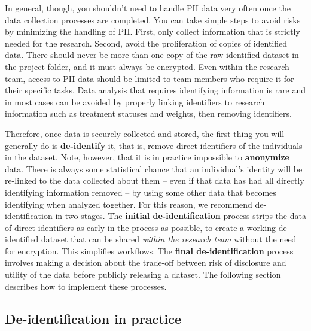 \begin{fullwidth}
In general, though, you shouldn't need to handle PII data very often
once the data collection processes are completed.
You can take simple steps to avoid risks by minimizing the handling of PII.
First, only collect information that is strictly needed for the research.
Second, avoid the proliferation of copies of identified data.
There should never be more than one copy of the raw identified dataset in the project folder,
and it must always be encrypted.
Even within the research team,
access to PII data should be limited to team members who require it for their specific tasks.
Data analysis that requires identifying information is rare
and in most cases can be avoided by properly linking identifiers to research information
such as treatment statuses and weights, then removing identifiers.

Therefore, once data is securely collected and stored,
the first thing you will generally do is \textbf{de-identify} it,
that is, remove direct identifiers of the individuals in the dataset.
Note, however, that it is in practice impossible to \textbf{anonymize} data.
There is always some statistical chance that an individual's identity
will be re-linked to the data collected about them
-- even if that data has had all directly identifying information removed --
by using some other data that becomes identifying when analyzed together.
For this reason, we recommend de-identification in two stages.
The \textbf{initial de-identification} process strips the data of direct identifiers
as early in the process as possible,
to create a working de-identified dataset that
can be shared \textit{within the research team} without the need for encryption.
This simplifies workflows.
The \textbf{final de-identification} process involves
making a decision about the trade-off between
risk of disclosure and utility of the data
before publicly releasing a dataset.
The following section describes how to implement these processes.


\subsection{De-identification in practice}


\end{fullwidth}
